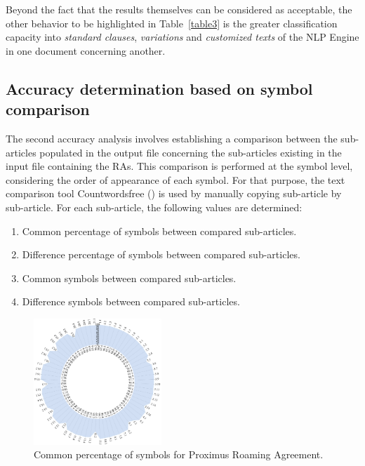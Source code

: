 Beyond the fact that the results themselves can be considered as acceptable, the other behavior to be highlighted in Table~\ref{table3} is the greater classification capacity into \textit{standard clauses}, \textit{variations} and \textit{customized texts} of the NLP Engine in one document concerning another.

\subsection{Accuracy determination based on symbol comparison}
The second accuracy analysis involves establishing a comparison between the sub-articles populated in the output file concerning the sub-articles existing in the input file containing the RAs. This comparison is performed at the symbol level, considering the order of appearance of each symbol. For that purpose, the text comparison tool Countwordsfree (\cite{countwordsfree}) is used by manually copying sub-article by sub-article. For each sub-article, the following values are determined:

\begin{enumerate}
\item Common percentage of symbols between compared sub-articles.
\item Difference percentage of symbols between compared sub-articles.
\item Common symbols between compared sub-articles.
\item Difference symbols between compared sub-articles.
\end{enumerate}

\begin{figure}[htbp]
\centerline{\includegraphics[width=0.43\textwidth]{images/Proximus.png}}
\caption{Common percentage of symbols for Proximus Roaming Agreement.}
\label{fig3}
\end{figure}

